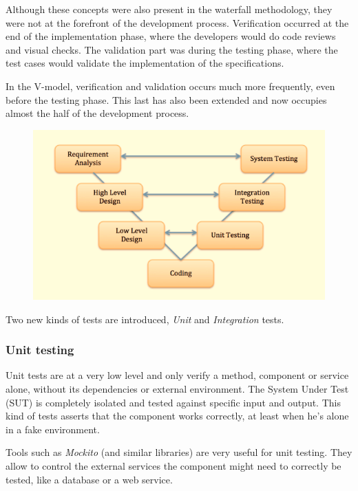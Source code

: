 Although these concepts were also present in the waterfall methodology, they
were not at the forefront of the development process.
Verification occurred at the end of the implementation phase, where the
developers would do code reviews and visual checks.
The validation part was during the testing phase, where the test cases
would validate the implementation of the specifications.

In the V-model, verification and validation occurs much more frequently,
even before the testing phase.
This last has also been extended and now occupies almost the half of the
development process.

\begin{figure}
    \includegraphics[width=\textwidth]{../../resources/images/waterfall/v_model.png}
\end{figure}

Two new kinds of tests are introduced, \textit{Unit} and \textit{Integration}
tests.

\subsubsection{Unit testing}
Unit tests are at a very low level and only verify  a method, component or
service alone, without its dependencies or external environment.
The System Under Test (SUT) is completely isolated and tested against specific
input and output.
This kind of tests asserts that the component works correctly, at least when
he's alone in a fake environment.

Tools such as \textit{Mockito} (and similar libraries) are very useful for
unit testing.
They allow to control the external services the component might need to
correctly be tested, like a database or a web service.

